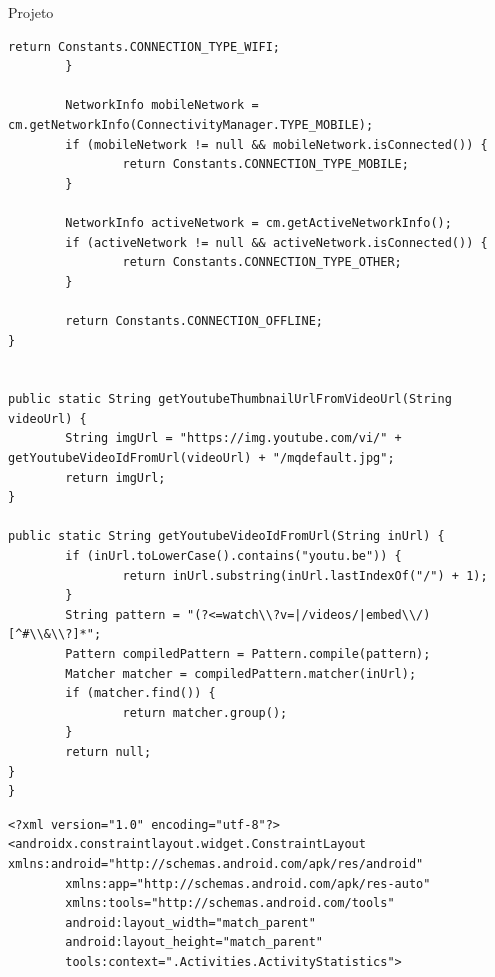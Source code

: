 \documentclass[
	12pt,				%
	openright,			%
	twoside,			%
	a4paper,			%
	english,			%
	french,				%
	spanish,			%
	brazil				%
	]{abntex2}
\begin{document}
\begin{chapter}{Projeto}
\begin{lstlisting}[numbers=none,basicstyle=\small,
caption={Helper.java},
title={Helper.java},
label={Helper.java}]
				return Constants.CONNECTION_TYPE_WIFI;
		}

		NetworkInfo mobileNetwork = cm.getNetworkInfo(ConnectivityManager.TYPE_MOBILE);
		if (mobileNetwork != null && mobileNetwork.isConnected()) {
				return Constants.CONNECTION_TYPE_MOBILE;
		}

		NetworkInfo activeNetwork = cm.getActiveNetworkInfo();
		if (activeNetwork != null && activeNetwork.isConnected()) {
				return Constants.CONNECTION_TYPE_OTHER;
		}

		return Constants.CONNECTION_OFFLINE;
}


public static String getYoutubeThumbnailUrlFromVideoUrl(String videoUrl) {
		String imgUrl = "https://img.youtube.com/vi/" + getYoutubeVideoIdFromUrl(videoUrl) + "/mqdefault.jpg";
		return imgUrl;
}

public static String getYoutubeVideoIdFromUrl(String inUrl) {
		if (inUrl.toLowerCase().contains("youtu.be")) {
				return inUrl.substring(inUrl.lastIndexOf("/") + 1);
		}
		String pattern = "(?<=watch\\?v=|/videos/|embed\\/)[^#\\&\\?]*";
		Pattern compiledPattern = Pattern.compile(pattern);
		Matcher matcher = compiledPattern.matcher(inUrl);
		if (matcher.find()) {
				return matcher.group();
		}
		return null;
}
}
\end{lstlisting}

\begin{lstlisting}[numbers=none,basicstyle=\small,
caption={ActivityVideos.xml},
title={ActivityVideos.xml},
label={ActivityVideos.xml}]
<?xml version="1.0" encoding="utf-8"?>
<androidx.constraintlayout.widget.ConstraintLayout xmlns:android="http://schemas.android.com/apk/res/android"
		xmlns:app="http://schemas.android.com/apk/res-auto"
		xmlns:tools="http://schemas.android.com/tools"
		android:layout_width="match_parent"
		android:layout_height="match_parent"
		tools:context=".Activities.ActivityStatistics">



\end{lstlisting}
\end{chapter}
\end{document}
